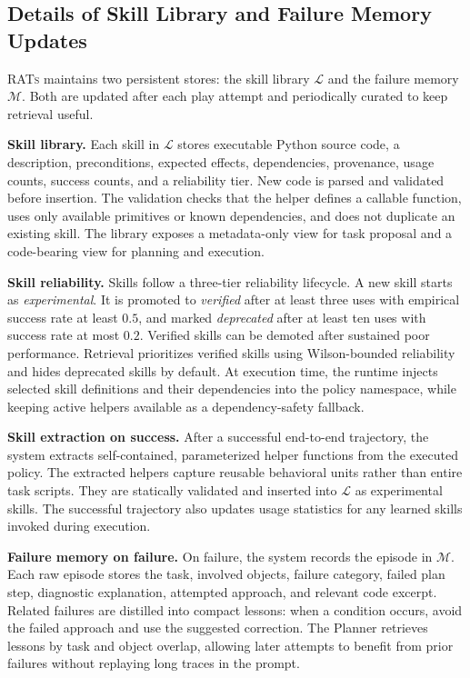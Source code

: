 \documentclass{llmxive}
\begin{document}
\subsection{Details of Skill Library and Failure Memory Updates}
\label{sec:appendix_skill_memory}

\textsc{RATs} maintains two persistent stores: the skill library $\mathcal{L}$
and the failure memory $\mathcal{M}$. Both are updated after each play attempt
and periodically curated to keep retrieval useful.

\textbf{Skill library.}
Each skill in $\mathcal{L}$ stores executable Python source code, a
description, preconditions, expected effects, dependencies, provenance, usage
counts, success counts, and a reliability tier. New code is parsed and
validated before insertion. The validation checks that the helper defines a
callable function, uses only available primitives or known dependencies, and
does not duplicate an existing skill. The library exposes a metadata-only view
for task proposal and a code-bearing view for planning and execution.

\textbf{Skill reliability.}
Skills follow a three-tier reliability lifecycle. A new skill starts as
\emph{experimental}. It is promoted to \emph{verified} after at least three
uses with empirical success rate at least $0.5$, and marked
\emph{deprecated} after at least ten uses with success rate at most $0.2$.
Verified skills can be demoted after sustained poor performance. Retrieval
prioritizes verified skills using Wilson-bounded reliability and hides
deprecated skills by default. At execution time, the runtime injects selected
skill definitions and their dependencies into the policy namespace, while
keeping active helpers available as a dependency-safety fallback.

\textbf{Skill extraction on success.}
After a successful end-to-end trajectory, the system extracts self-contained,
parameterized helper functions from the executed policy. The extracted helpers
capture reusable behavioral units rather than entire task scripts. They are
statically validated and inserted into $\mathcal{L}$ as experimental skills.
The successful trajectory also updates usage statistics for any learned skills
invoked during execution.

\textbf{Failure memory on failure.}
On failure, the system records the episode in $\mathcal{M}$. Each raw episode
stores the task, involved objects, failure category, failed plan step,
diagnostic explanation, attempted approach, and relevant code excerpt. Related
failures are distilled into compact lessons: when a condition occurs, avoid the
failed approach and use the suggested correction. The Planner retrieves lessons
by task and object overlap, allowing later attempts to benefit from prior
failures without replaying long traces in the prompt.
\end{document}
